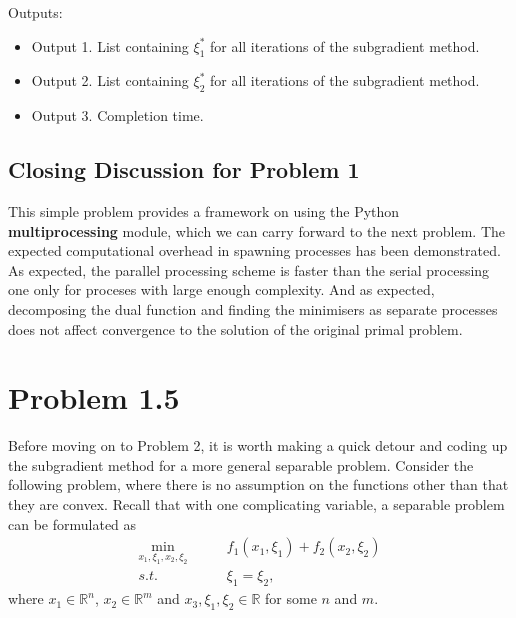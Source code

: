 \documentclass[12pt]{article}
\begin{document}
Outputs:
\begin{itemize}
	\item Output 1. List containing $\xi_1^*$ for all iterations of the subgradient method.
	\item Output 2. List containing $\xi_2^*$ for all iterations of the subgradient method.
	\item Output 3. Completion time.
\end{itemize}

\subsection*{Closing Discussion for Problem 1}

This simple problem provides a framework on using the Python \textbf{multiprocessing} module, which we can carry forward to the next problem. The expected computational overhead in spawning processes has been demonstrated. As expected, the parallel processing scheme is faster than the serial processing one only for proceses with large enough complexity. And as expected, decomposing the dual function and finding the minimisers as separate processes does not affect convergence to the solution of the original primal problem.

\section*{Problem 1.5}

Before moving on to Problem 2, it is worth making a quick detour and coding up the subgradient method for a more general separable problem. Consider the following problem, where there is no assumption on the functions other than that they are convex. Recall that with one complicating variable, a separable problem can be formulated as
\begin{align*}
\min_{x_1,\xi_1,x_2,\xi_2}\qquad&f_1(x_1,\xi_1)+f_2(x_2,\xi_2)\\
s.t.\qquad&\xi_1=\xi_2,
\end{align*}
where $x_1\in\mathbb{R}^n$, $x_2\in\mathbb{R}^m$ and $x_3,\xi_1,\xi_2\in\mathbb{R}$ for some $n$ and $m$.
\end{document}
